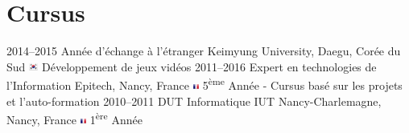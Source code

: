 \documentclass[]{friggeri-cv} %
\begin{document}
\section{Cursus}
\begin{entrylist}
\entry
{2014--2015}
{Année d'échange {\normalfont à l'étranger}}
{Keimyung University, Daegu, Corée du Sud {\includegraphics[height=0.3cm]{./flags/kr.png}}}
{Développement de jeux vidéos}
\entry
{2011--2016}
{Expert {\normalfont en technologies de l'Information}}
{Epitech, Nancy, France {\includegraphics[height=0.2cm]{./flags/fr.png}}}
{5\textsuperscript{ème} Année - Cursus basé sur les projets et l'auto-formation}
\entry
{2010--2011}
{DUT {\normalfont Informatique}}
{IUT Nancy-Charlemagne, Nancy, France {\includegraphics[height=0.2cm]{./flags/fr.png}}}
{1\textsuperscript{ère} Année}
\end{entrylist}
\end{document}

